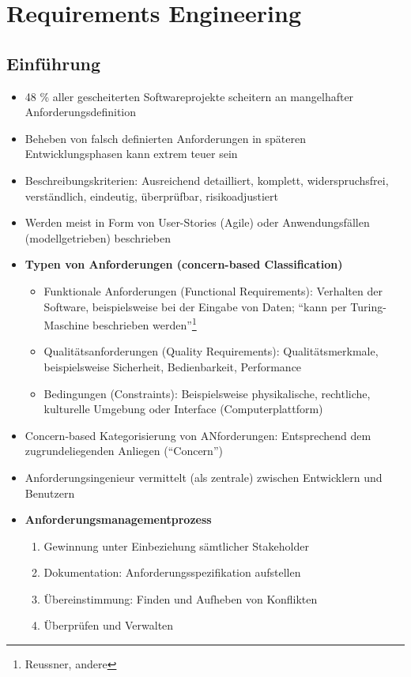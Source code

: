 \section{Requirements Engineering}

\subsection{Einführung}
\begin{itemize}
	\item 48 \% aller gescheiterten Softwareprojekte scheitern an mangelhafter Anforderungsdefinition
	\item Beheben von falsch definierten Anforderungen in späteren Entwicklungsphasen kann extrem teuer sein
	\item Beschreibungskriterien: Ausreichend detailliert, komplett, widerspruchsfrei, verständlich, eindeutig, überprüfbar, risikoadjustiert
	\item Werden meist in Form von User-Stories (Agile) oder Anwendungsfällen (modellgetrieben) beschrieben
	\item \textbf{Typen von Anforderungen (concern-based Classification)}
	\begin{itemize}
		\item Funktionale Anforderungen (Functional Requirements): Verhalten der Software, beispielsweise bei der Eingabe von Daten; "`kann per Turing-Maschine beschrieben werden"'\footnote{Reussner, andere}
		\item Qualitätsanforderungen (Quality Requirements): Qualitätsmerkmale, beispielsweise Sicherheit, Bedienbarkeit, Performance
		\item Bedingungen (Constraints): Beispielsweise physikalische, rechtliche, kulturelle Umgebung oder Interface (Computerplattform)
	\end{itemize}
	\item Concern-based Kategorisierung von ANforderungen: Entsprechend dem zugrundeliegenden Anliegen ("`Concern"')
	\item Anforderungsingenieur vermittelt (als zentrale) zwischen Entwicklern und Benutzern
	\item \textbf{Anforderungsmanagementprozess}
	\begin{enumerate}
		\item Gewinnung unter Einbeziehung sämtlicher Stakeholder
		\item Dokumentation: Anforderungsspezifikation aufstellen
		\item Übereinstimmung: Finden und Aufheben von Konflikten
		\item Überprüfen und Verwalten
	\end{enumerate}
\end{itemize}


